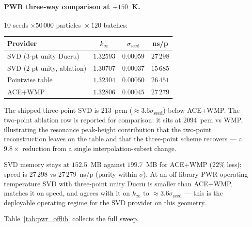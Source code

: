 \paragraph{PWR three-way comparison at $+150$~K.}
$10$ seeds $\times 50\,000$ particles~$\times~120$ batches:

\begin{center}
\begin{tabular}{@{}lccc@{}}
\toprule
Provider         & $k_\infty$ & $\sigma_\text{seed}$ & ns/p \\
\midrule
SVD ($3$-pt unity Ducru) & $1.32593$ & $0.00059$ & $27\,298$ \\
SVD ($2$-pt unity, ablation) & $1.30707$ & $0.00037$ & $15\,685$ \\
Pointwise table    & $1.32304$ & $0.00050$ & $26\,451$ \\
ACE+WMP            & $1.32806$ & $0.00045$ & $27\,279$ \\
\bottomrule
\end{tabular}
\end{center}

The shipped three-point SVD is $213$~pcm
($\approx\!3.6\sigma_\text{seed}$) below ACE+WMP. The
two-point ablation row is reported for comparison: it
sits at $2094$~pcm vs WMP, illustrating the resonance
peak-height contribution that the two-point reconstruction
leaves on the table and that the three-point scheme
recovers --- a $9.8\times$ reduction from a single
interpolation-subset change.

SVD memory stays at $152.5$~MB against $199.7$~MB for
ACE+WMP ($22\%$ less); speed is $27\,298$ vs $27\,279$~ns/p
(parity within $\sigma$). At an off-library PWR operating
temperature SVD with three-point unity Ducru is smaller
than ACE+WMP, matches it on speed, and agrees with it on
$k_\infty$ to $\approx\!3.6\sigma_\text{seed}$ --- this is
the deployable operating regime for the SVD provider on
this geometry.

Table~\ref{tab:pwr_offlib} collects the full sweep.

